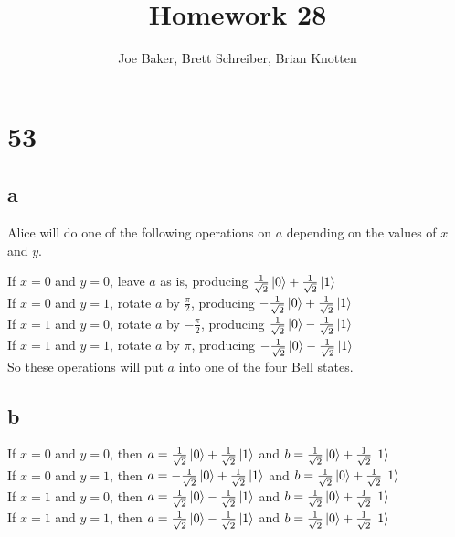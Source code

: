 \documentclass[letterpaper,notitlepage,twoside]{article}
\begin{document}
\title{Homework 28}
\author{Joe Baker, Brett Schreiber, Brian Knotten}
\maketitle

\section*{53}
\subsection*{a}
Alice will do one of the following operations on $a$ depending on the values of $x$ and $y$.

If $x = 0$ and $y = 0$, leave $a$ as is, producing $\frac{1}{\sqrt 2} \ket{0} + \frac{1}{\sqrt 2} \ket{1}$ \\
If $x = 0$ and $y = 1$, rotate $a$ by $\frac{\pi}{2}$, producing $-\frac{1}{\sqrt 2} \ket{0} + \frac{1}{\sqrt 2} \ket{1}$ \\
If $x = 1$ and $y = 0$, rotate $a$ by $-\frac{\pi}{2}$, producing $\frac{1}{\sqrt 2} \ket{0} - \frac{1}{\sqrt 2} \ket{1}$  \\
If $x = 1$ and $y = 1$, rotate $a$ by $\pi$, producing $-\frac{1}{\sqrt 2} \ket{0} - \frac{1}{\sqrt 2} \ket{1}$  \\

So these operations will put $a$ into one of the four Bell states.

\subsection*{b}
If $x = 0$ and $y = 0$, then  $a = \frac{1}{\sqrt 2} \ket{0} + \frac{1}{\sqrt 2} \ket{1}$ and $b = \frac{1}{\sqrt 2} \ket{0} + \frac{1}{\sqrt 2} \ket{1}$ \\
If $x = 0$ and $y = 1$, then $a = -\frac{1}{\sqrt 2} \ket{0} + \frac{1}{\sqrt 2} \ket{1}$ and $b = \frac{1}{\sqrt 2} \ket{0} + \frac{1}{\sqrt 2} \ket{1}$ \\
If $x = 1$ and $y = 0$, then $a = \frac{1}{\sqrt 2} \ket{0} - \frac{1}{\sqrt 2} \ket{1}$ and $b = \frac{1}{\sqrt 2} \ket{0} + \frac{1}{\sqrt 2} \ket{1}$ \\
If $x = 1$ and $y = 1$, then $a =\frac{1}{\sqrt 2} \ket{0} - \frac{1}{\sqrt 2} \ket{1}$ and $b = \frac{1}{\sqrt 2} \ket{0} + \frac{1}{\sqrt 2} \ket{1}$ \\
\end{document}
